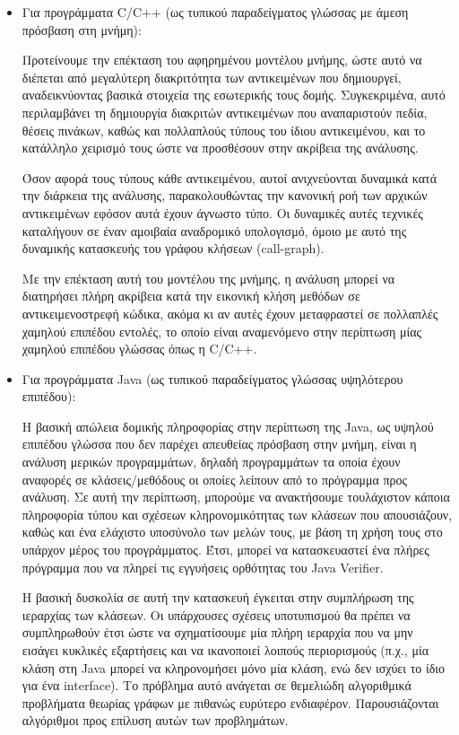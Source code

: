 \begin{itemize}
\item Για προγράμματα {\en C/C++} (ως τυπικού παραδείγματος γλώσσας με
  άμεση πρόσβαση στη μνήμη):

  Προτείνουμε την επέκταση του αφηρημένου μοντέλου μνήμης, ώστε αυτό
  να διέπεται από μεγαλύτερη διακριτότητα των αντικειμένων που
  δημιουργεί, αναδεικνύοντας βασικά στοιχεία της εσωτερικής τους
  δομής.  Συγκεκριμένα, αυτό περιλαμβάνει τη δημιουργία διακριτών
  αντικειμένων που αναπαριστούν πεδία, θέσεις πινάκων, καθώς και
  πολλαπλούς τύπους του ίδιου αντικειμένου, και το κατάλληλο χειρισμό
  τους ώστε να προσθέσουν στην ακρίβεια της ανάλυσης.

  Όσον αφορά τους τύπους κάθε αντικειμένου, αυτοί ανιχνεύονται
  δυναμικά κατά την διάρκεια της ανάλυσης, παρακολουθώντας την
  κανονική ροή των αρχικών αντικειμένων εφόσον αυτά έχουν άγνωστο
  τύπο.  Οι δυναμικές αυτές τεχνικές καταλήγουν σε έναν αμοιβαία
  αναδρομικό υπολογισμό, όμοιο με αυτό της δυναμικής κατασκευής του
  γράφου κλήσεων ({\en call-graph}).

  Με την επέκταση αυτή του μοντέλου της μνήμης, η ανάλυση μπορεί να
  διατηρήσει πλήρη ακρίβεια κατά την εικονική κλήση μεθόδων σε
  αντικειμενοστρεφή κώδικα, ακόμα κι αν αυτές έχουν μεταφραστεί σε
  πολλαπλές χαμηλού επιπέδου εντολές, το οποίο είναι αναμενόμενο στην
  περίπτωση μίας χαμηλού επιπέδου γλώσσας όπως η {\en C/C++}.
\item Για προγράμματα {\en Java} (ως τυπικού παραδείγματος γλώσσας
  υψηλότερου επιπέδου):

  Η βασική απώλεια δομικής πληροφορίας στην περίπτωση της {\en Java},
  ως υψηλού επιπέδου γλώσσα που δεν παρέχει απευθείας πρόσβαση στην
  μνήμη, είναι η ανάλυση μερικών προγραμμάτων, δηλαδή προγραμμάτων τα
  οποία έχουν αναφορές σε κλάσεις/μεθόδους οι οποίες λείπουν από το
  πρόγραμμα προς ανάλυση.  Σε αυτή την περίπτωση, μπορούμε να
  ανακτήσουμε τουλάχιστον κάποια πληροφορία τύπου και σχέσεων
  κληρονομικότητας των κλάσεων που απουσιάζουν, καθώς και ένα ελάχιστο
  υποσύνολο των μελών τους, με βάση τη χρήση τους στο υπάρχον μέρος
  του προγράμματος.  Έτσι, μπορεί να κατασκευαστεί ένα πλήρες
  πρόγραμμα που να πληρεί τις εγγυήσεις ορθότητας του {\en Java
    Verifier}.

  Η βασική δυσκολία σε αυτή την κατασκευή έγκειται στην συμπλήρωση της
  ιεραρχίας των κλάσεων.  Οι υπάρχουσες σχέσεις υποτυπισμού θα πρέπει
  να συμπληρωθούν έτσι ώστε να σχηματίσουμε μία πλήρη ιεραρχία που να
  μην εισάγει κυκλικές εξαρτήσεις και να ικανοποιεί λοιπούς
  περιορισμούς (π.χ., μία κλάση στη {\en Java} μπορεί να κληρονομήσει
  μόνο μία κλάση, ενώ δεν ισχύει το ίδιο για ένα {\en interface}).  Το
  πρόβλημα αυτό ανάγεται σε θεμελιώδη αλγοριθμικά προβλήματα θεωρίας
  γράφων με πιθανώς ευρύτερο ενδιαφέρον.  Παρουσιάζονται αλγόριθμοι
  προς επίλυση αυτών των προβλημάτων.


\end{itemize}

